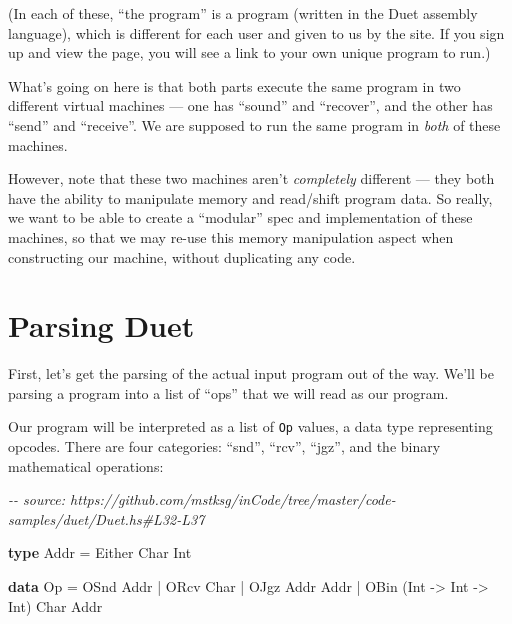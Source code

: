 \documentclass[]{article}
\newenvironment{Shaded}{}{}
\newcommand{\CommentTok}[1]{\textcolor[rgb]{0.38,0.63,0.69}{\textit{#1}}}
\newcommand{\DataTypeTok}[1]{\textcolor[rgb]{0.56,0.13,0.00}{#1}}
\newcommand{\KeywordTok}[1]{\textcolor[rgb]{0.00,0.44,0.13}{\textbf{#1}}}
\newcommand{\NormalTok}[1]{#1}
\newcommand{\OperatorTok}[1]{\textcolor[rgb]{0.40,0.40,0.40}{#1}}
\newcommand{\OtherTok}[1]{\textcolor[rgb]{0.00,0.44,0.13}{#1}}
\begin{document}
(In each of these, ``the program'' is a program (written in the Duet assembly
language), which is different for each user and given to us by the site. If you
sign up and view the page, you will see a link to your own unique program to
run.)

What's going on here is that both parts execute the same program in two
different virtual machines --- one has ``sound'' and ``recover'', and the other
has ``send'' and ``receive''. We are supposed to run the same program in
\emph{both} of these machines.

However, note that these two machines aren't \emph{completely} different ---
they both have the ability to manipulate memory and read/shift program data. So
really, we want to be able to create a ``modular'' spec and implementation of
these machines, so that we may re-use this memory manipulation aspect when
constructing our machine, without duplicating any code.

\section{Parsing Duet}\label{parsing-duet}

First, let's get the parsing of the actual input program out of the way. We'll
be parsing a program into a list of ``ops'' that we will read as our program.

Our program will be interpreted as a list of \texttt{Op} values, a data type
representing opcodes. There are four categories: ``snd'', ``rcv'', ``jgz'', and
the binary mathematical operations:

\begin{Shaded}
\begin{Highlighting}[]
\CommentTok{{-}{-} source: https://github.com/mstksg/inCode/tree/master/code{-}samples/duet/Duet.hs\#L32{-}L37}

\KeywordTok{type} \DataTypeTok{Addr} \OtherTok{=} \DataTypeTok{Either} \DataTypeTok{Char} \DataTypeTok{Int}

\KeywordTok{data} \DataTypeTok{Op} \OtherTok{=} \DataTypeTok{OSnd} \DataTypeTok{Addr}
        \OperatorTok{|} \DataTypeTok{ORcv} \DataTypeTok{Char}
        \OperatorTok{|} \DataTypeTok{OJgz} \DataTypeTok{Addr} \DataTypeTok{Addr}
        \OperatorTok{|} \DataTypeTok{OBin}\NormalTok{ (}\DataTypeTok{Int} \OtherTok{{-}\textgreater{}} \DataTypeTok{Int} \OtherTok{{-}\textgreater{}} \DataTypeTok{Int}\NormalTok{) }\DataTypeTok{Char} \DataTypeTok{Addr}
\end{Highlighting}
\end{Shaded}
\end{document}
